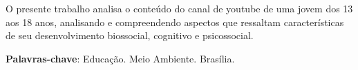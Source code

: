 
\setlength{\absparsep}{18pt} %
\begin{resumo}
 O presente trabalho analisa o conteúdo do canal de youtube de uma jovem dos 13 aos 18 anos, analisando e compreendendo aspectos que ressaltam características  de seu desenvolvimento biossocial, cognitivo e psicossocial.

 \textbf{Palavras-chave}: Educação. Meio Ambiente. Brasília.
\end{resumo}
